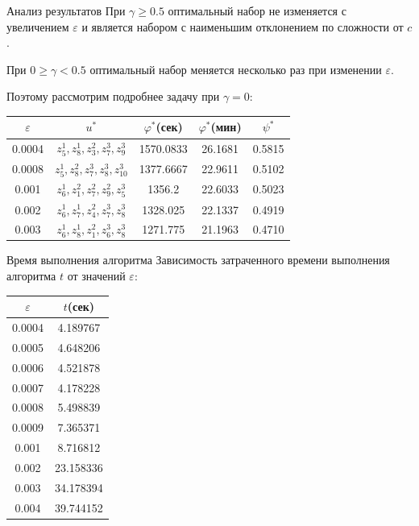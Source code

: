 \documentclass[aspectratio=169]{beamer}
\begin{document}
    \begin{frame}{Анализ результатов}
        При $\gamma\geq 0.5$ оптимальный набор не изменяется с увеличением $\varepsilon$ и является набором с наименьшим отклонением по сложности от $c$.\newline
        
        При $0\geq\gamma<0.5$ оптимальный набор меняется несколько раз при изменении $\varepsilon$.\newline
        
        Поэтому рассмотрим подробнее задачу при $\gamma=0$:
        
        \begin{table}[]
\begin{tabular}{|c|c|c|c|c|}
\hline
$\varepsilon$ & $u^*$ & $\varphi^*$(сек) & $\varphi^*$(мин) & $\psi^*$ \\ \hline
0.0004 & $z_5^1,z_8^1,z_3^2,z_7^3,z_9^3$ & 1570.0833 & 26.1681 & 0.5815 \\ \hline
0.0008 & $z_5^1,z_8^2,z_7^3,z_8^3,z_{10}^3$ & 1377.6667 & 22.9611 & 0.5102 \\ \hline
0.001 & $z_6^1,z_1^2,z_7^2,z_9^2,z_5^3$ & 1356.2    & 22.6033 & 0.5023 \\ \hline
0.002 & $z_6^1,z_7^1,z_4^2,z_7^3,z_8^3$ & 1328.025  & 22.1337 & 0.4919 \\ \hline
0.003 & $z_6^1,z_8^1,z_1^2,z_6^3,z_8^3$ & 1271.775  & 21.1963 & 0.4710 \\ \hline
\end{tabular}
\end{table}
    \end{frame}
    
    \begin{frame}{Время выполнения алгоритма}
        Зависимость затраченного времени выполнения алгоритма $t$ от значений $\varepsilon$:
        \begin{table}[]
\begin{tabular}{|c|c|} \hline
$\varepsilon$ & $t$(сек) \\ \hline
0.0004 & 4.189767  \\ \hline
0.0005 & 4.648206  \\ \hline
0.0006 & 4.521878  \\ \hline
0.0007 & 4.178228  \\ \hline
0.0008 & 5.498839  \\ \hline
0.0009 & 7.365371  \\ \hline
0.001  & 8.716812  \\ \hline
0.002  & 23.158336 \\ \hline
0.003  & 34.178394 \\ \hline
0.004  & 39.744152 \\ \hline
\end{tabular}
\end{table}
    \end{frame}
    
\end{document}
